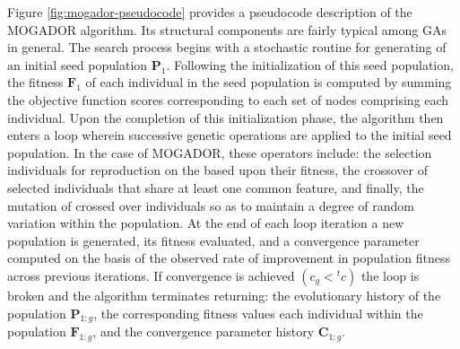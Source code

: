 Figure \ref{fig:mogador-pseudocode} provides a pseudocode description of the MOGADOR algorithm. Its structural components are fairly typical among GAs in general. The search process begins with a stochastic routine for generating of an initial seed population $\textbf{P}_1$. Following the initialization of this seed population, the fitness $\textbf{F}_1$ of each individual in the seed population is computed by summing the objective function scores corresponding to each set of nodes comprising each individual. Upon the completion of this initialization phase, the algorithm then enters a loop wherein successive genetic operations are applied to the initial seed population. In the case of MOGADOR, these operators include: the selection individuals for reproduction on the based upon their fitness, the crossover of selected individuals that share at least one common feature, and finally, the mutation of crossed over individuals so as to maintain a degree of random variation within the population. At the end of each loop iteration a new population is generated, its fitness evaluated, and a convergence parameter computed on the basis of the observed rate of improvement in population fitness across previous iterations. If convergence is achieved $(c_g < {}^{t}c)$ the loop is broken and the algorithm terminates returning: the evolutionary history of the population $\textbf{P}_{1:g}$, the corresponding fitness values each individual within the population $\textbf{F}_{1:g}$, and the convergence parameter history $\textbf{C}_{1:g}$. \\
               
